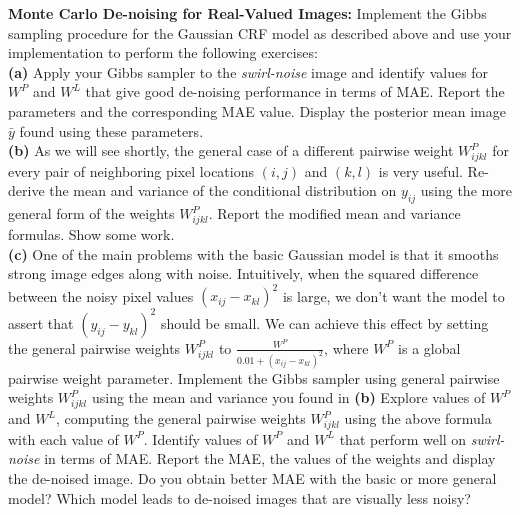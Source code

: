 \documentclass[11pt]{article}
\newcommand{\gaussian}{swirl}
\begin{document}
\begin{problem}{60} \textbf{Monte Carlo De-noising for Real-Valued Images:}
Implement the Gibbs sampling procedure for the Gaussian CRF model as described above and use your implementation to perform the following exercises:
\\

\textbf{(a)} Apply your Gibbs sampler to the \textit{\gaussian-noise} image and identify values for $W^P$ and $W^L$ that give good de-noising performance in terms of MAE. Report the parameters and the corresponding MAE value. Display the posterior mean image $\bar{y}$ found using these parameters.\\

\textbf{(b)} As we will see shortly, the general case of a different pairwise weight $W^P_{ijkl}$ for every pair of neighboring pixel locations $(i,j)$ and $(k,l)$ is very useful. Re-derive the mean and variance of the conditional distribution on $y_{ij}$ using the more general form of the weights $W^P_{ijkl}$. Report the modified mean and variance formulas. Show some work.\\

\textbf{(c)} One of the main problems with the basic Gaussian model is that it smooths strong image edges along with noise. Intuitively, when the squared difference between the noisy pixel values $(x_{ij}-x_{kl})^2$ is large, we don't want the model to assert that $(y_{ij}-y_{kl})^2$ should be small. We can achieve this effect by setting the general pairwise weights $W^P_{ijkl}$ to $\frac{W^P}{0.01+(x_{ij}-x_{kl})^2}$, where $W^P$ is a global pairwise weight parameter. Implement the Gibbs sampler using general pairwise weights $W^P_{ijkl}$ using the mean and variance you found in \textbf{(b)}
Explore values of $W^P$ and $W^L$, computing the general pairwise weights $W^P_{ijkl}$ using the above formula with each value of $W^P$. Identify values of $W^P$ and $W^L$ that perform well on \textit{\gaussian-noise} in terms of MAE. Report the MAE, the values of the weights and display the de-noised image. Do you obtain better MAE with the basic or more general model? Which model leads to de-noised images that are visually less noisy?

\end{problem}

\showpoints
\end{document}
